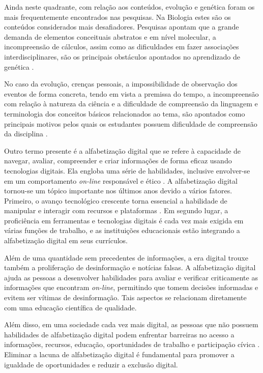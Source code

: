 \documentclass[portuguese]{textolivre}
\begin{document}
Ainda neste quadrante, com relação aos conteúdos, evolução e genética foram os mais frequentemente encontrados nas pesquisas. Na Biologia estes são os conteúdos considerados mais desafiadores. Pesquisas apontam que a grande demanda de elementos conceituais abstratos e em nível molecular, a incompreensão de cálculos, assim como as dificuldades em fazer associações interdisciplinares, são os principais obstáculos apontados no aprendizado de genética \cite{fabricio_compreensao_2006,catarinacho_o_2011}.

No caso da evolução, crenças pessoais, a impossibilidade de observação dos eventos de forma concreta, tendo em vista a premissa do tempo, a incompreensão com relação à natureza da ciência e a dificuldade de compreensão da linguagem e terminologia dos conceitos básicos relacionados ao tema, são apontados como principais motivos pelos quais os estudantes possuem dificuldade de compreensão da disciplina \cite{gregory_understanding_2009,sinatra_intentions_2003,rutledge_evolutionary_2000}.

Outro termo presente é a alfabetização digital que se refere à capacidade de navegar, avaliar, compreender e criar informações de forma eficaz usando tecnologias digitais. Ela engloba uma série de habilidades, inclusive envolver-se em um comportamento \textit{on-line} responsável e ético \cite{livingstone_balancing_2010}. A alfabetização digital tornou-se um tópico importante nos últimos anos devido a vários fatores. Primeiro, o avanço tecnológico crescente torna essencial a habilidade de manipular e interagir com recursos e plataformas \cite{koltay_media_2011}. Em segundo lugar, a proficiência em ferramentas e tecnologias digitais é cada vez mais exigida em várias funções de trabalho, e as instituições educacionais estão integrando a alfabetização digital em seus currículos.

Além de uma quantidade sem precedentes de informações, a era digital trouxe também a proliferação de desinformação e notícias falsas. A alfabetização digital ajuda as pessoas a desenvolver habilidades para avaliar e verificar criticamente as informações que encontram \textit{on-line}, permitindo que tomem decisões informadas e evitem ser vítimas de desinformação. Tais aspectos se relacionam diretamente com uma educação científica de qualidade.

Além disso, em uma sociedade cada vez mais digital, as pessoas que não possuem habilidades de alfabetização digital podem enfrentar barreiras no acesso a informações, recursos, educação, oportunidades de trabalho e participação cívica \cite{warschauer_new_2010}. Eliminar a lacuna de alfabetização digital é fundamental para promover a igualdade de oportunidades e reduzir a exclusão digital.
\end{document}

